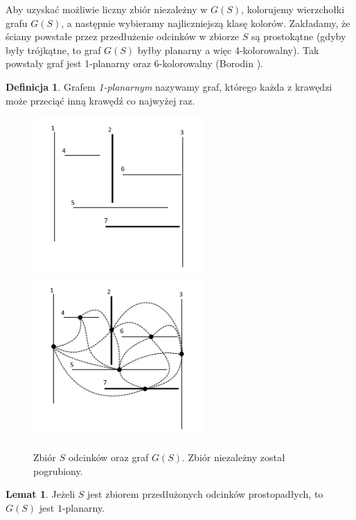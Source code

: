 \documentclass[brudnopis]{xmgr}
\theoremstyle{definition}
\newtheorem{Lemat}{Lemat}
\newtheorem{Definicja}{Definicja}
\begin{document}
\indent Aby uzyskać możliwie liczny zbiór niezależny w $G(S)$, kolorujemy wierzchołki grafu $G(S)$, a następnie wybieramy najliczniejszą klasę kolorów. Zakładamy, że ściany powstałe przez przedłużenie odcinków w zbiorze $S$ są prostokątne (gdyby były trójkątne, to graf $G(S)$ byłby planarny a więc 4-kolorowalny). 
Tak powstały graf jest 1-planarny oraz 6-kolorowalny (Borodin \cite{borodin}).

\begin{Definicja}
  Grafem \emph{1-planarnym} nazywamy graf, którego każda z krawędzi może przeciąć inną krawędź co najwyżej raz.
\end{Definicja}
\begin{figure}[ht!]
  \centering
  \includegraphics[width=6.5cm]{rysunki/zbior_odcinkow.png}
  \includegraphics[width=6.5cm]{rysunki/graf_zbioru_odcinkow.png}
  \caption{Zbiór $S$ odcinków oraz graf $G(S)$. Zbiór niezależny został pogrubiony.}
  \label{fig:przedluzone odcinki}
\end{figure} 

\begin{Lemat} \cite{knadajniki}
  Jeżeli $S$ jest zbiorem przedłużonych odcinków prostopadłych, to $G(S)$ jest $1$-planarny.
\end{Lemat}
\end{document}

